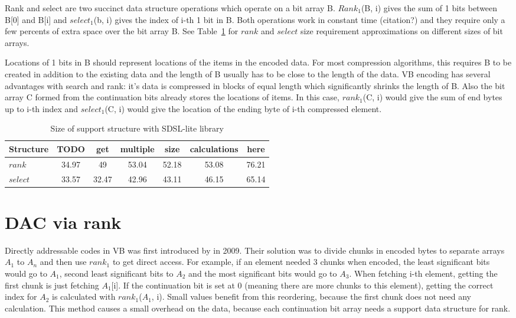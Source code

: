 Rank and select are two succinct data structure operations which operate on a bit array B. $Rank_1$(B, i) gives the sum of 1 bits between B[0] and B[i] and 
$select_1$(b, i) gives the index of i-th 1 bit in B. Both operations work in constant time (citation?) and they require only a few percents of extra 
space over the bit array B. See Table~\ref{supportsize} for $rank$ and $select$ size requirement approximations on different sizes of bit arrays. 

Locations of 1 bits in B should represent locations of the items in the encoded data. For most compression algorithms, this requires B to be created in addition 
to the existing data and the length of B usually has to be close to the length of the data. VB encoding has several advantages with search and rank: it's data 
is compressed in blocks of equal length which significantly shrinks the length of B. Also the bit array C formed from the continuation bits already stores the 
locations of items. In this case, $rank_1$(C, i) would give the sum of end bytes up to i-th index and $select_1$(C, i) would give the location of the ending 
byte of i-th compressed element.

\begin{table}
\centering
\caption{Size of support structure with SDSL-lite library}
\begin{tabular}{l||c c c c c c} 
Structure & TODO & get & multiple & size & calculations & here\\ 
\hline \hline 
$rank$ & 34.97 & 49 & 53.04 & 52.18 & 53.08 & 76.21\\
$select$ & 33.57 & 32.47 & 42.96 & 43.11 & 46.15 & 65.14\\
\hline
%
\end{tabular}
\label{supportsize}
\end{table}

\section{DAC via rank}
Directly addressable codes in VB was first introduced by \citep{Bri09} in 2009. Their solution was to divide chunks in encoded bytes to separate arrays $A_1$ to 
$A_n$ and then use $rank_1$ to get direct access. For example, if an element needed 3 chunks when encoded, the least significant bits would go to $A_1$, second 
least significant bits to $A_2$ and the most significant bits would go to $A_3$. When fetching i-th element, getting the first chunk is just fetching $A_1$[i]. 
If the continuation bit is set at 0 (meaning there are more chunks to this element), getting the correct index for $A_2$ is calculated with $rank_1$($A_1$, i). 
Small values benefit from this reordering, because the first chunk does not need any calculation. This method causes a small overhead on the data, because each 
continuation bit array needs a support data structure for rank. 

